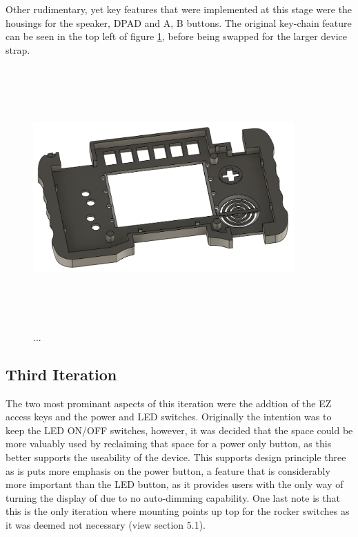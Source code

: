 Other rudimentary, yet key features that were implemented at this stage were the housings for the speaker, DPAD and A, B buttons.
The original key-chain feature can be seen in the top left of figure \ref{fig:iteration2_t_b}, before being swapped for the larger device strap.

\begin{figure} [h]
    \centering
    \includegraphics[width=10cm,height=10cm,keepaspectratio]{Figures/iteration2_top_back.png}
    \caption{...}
    \label{fig:iteration2_t_b}
\end{figure}

\subsection{Third Iteration}

The two most prominant aspects of this iteration were the addtion of the EZ access keys and the power and LED switches. 
Originally the intention was to keep the LED ON/OFF switches, however, it was decided that the space could be more valuably used by reclaiming that space for a power only button, as this better supports the useability of the device.
This supports design principle three as is puts more emphasis on the power button, a feature that is considerably more important than the LED button, as it provides users with the only way of turning the display of due to no auto-dimming capability.
One last note is that this is the only iteration where mounting points up top for the rocker switches as it was deemed not necessary (view section 5.1).

